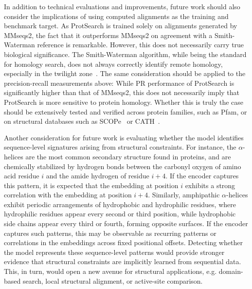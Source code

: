 \documentclass[twoside,a4paper]{master}
\begin{document}
In addition to technical evaluations and improvements, future work should also consider the implications of using computed alignments as the training and benchmark target. As ProtSearch is trained solely on alignments generated by MMseqs2, the fact that it outperforms MMseqs2 on agreement with a Smith-Waterman reference is remarkable. However, this does not necessarily carry true biological significance. The Smith-Waterman algorithm, while being the standard for homology search, does not always correctly identify remote homology, especially in the twilight zone~\cite{10.1093/protein/12.2.85}. The same consideration should be applied to the precision-recall measurements above: While PR performance of ProtSearch is significantly higher than that of MMseqs2, this does not necessarily imply that ProtSearch is more sensitive to protein homology. Whether this is truly the case should be extensively tested and verified across protein families, such as Pfam, or on structural databases such as SCOPe~\cite{andreeva2021scope} or CATH~\cite{10.1093/nar/gku947}.

Another consideration for future work is evaluating whether the model identifies sequence-level signatures arising from structural constraints. For instance, the \(\alpha\)-helices are the most common secondary structure found in proteins, and are chemically stabilized by hydrogen bonds between the carbonyl oxygen of amino acid residue \(i\) and the amide hydrogen of residue \(i+4\). If the encoder captures this pattern, it is expected that the embedding at position \(i\) exhibits a strong correlation with the embedding at position \(i+4\). Similarly, amphipathic \(\alpha\)-helices exhibit periodic arrangements of hydrophobic and hydrophilic residues, where hydrophilic residues appear every second or third position, while hydrophobic side chains appear every third or fourth, forming opposite surfaces. If the encoder captures such patterns, this may be observable as recurring patterns or correlations in the embeddings across fixed positional offsets. Detecting whether the model represents these sequence-level patterns would provide stronger evidence that structural constraints are implicitly learned from sequential data. This, in turn, would open a new avenue for structural applications, e.g. domain-based search, local structural alignment, or active-site comparison.


\newpage
\small

\printbibliography
\end{document}
